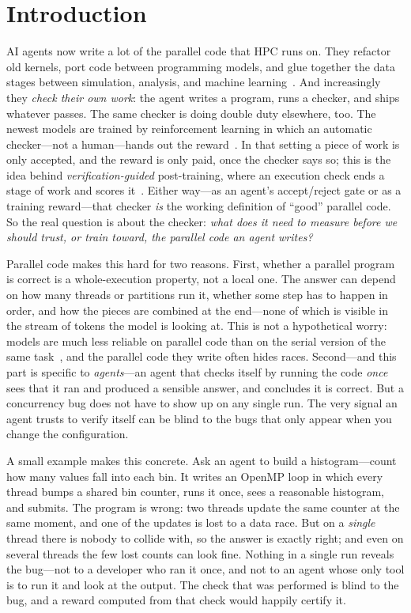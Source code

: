 \section{Introduction}

AI agents now write a lot of the parallel code that HPC runs on. They refactor old
kernels, port code between programming models, and glue together the data stages between
simulation, analysis, and machine learning~\cite{agentic_hpc}. And increasingly they
\emph{check their own work}: the agent writes a program, runs a checker, and ships
whatever passes. The same checker is doing double duty elsewhere, too. The newest models
are trained by reinforcement learning in which an automatic checker---not a human---hands
out the reward~\cite{rlvr,grpo}. In that setting a piece of work is only accepted, and the
reward is only paid, once the checker says so; this is the idea behind
\emph{verification-guided} post-training, where an execution check ends a stage of work
and scores it~\cite{options}. Either way---as an agent's accept/reject gate or as a
training reward---that checker \emph{is} the working definition of ``good'' parallel code.
So the real question is about the checker: \emph{what does it need to measure before we
should trust, or train toward, the parallel code an agent writes?}

Parallel code makes this hard for two reasons. First, whether a parallel program is
correct is a whole-execution property, not a local one. The answer can depend on how many
threads or partitions run it, whether some step has to happen in order, and how the pieces
are combined at the end---none of which is visible in the stream of tokens the model is
looking at. This is not a hypothetical worry: models are much less reliable on parallel
code than on the serial version of the same task~\cite{pareval}, and the parallel code
they write often hides races. Second---and this part is specific to \emph{agents}---an
agent that checks itself by running the code \emph{once} sees that it ran and produced a
sensible answer, and concludes it is correct. But a concurrency bug does not have to show
up on any single run. The very signal an agent trusts to verify itself can be blind to the
bugs that only appear when you change the configuration.

A small example makes this concrete. Ask an agent to build a histogram---count how many
values fall into each bin. It writes an OpenMP loop in which every thread bumps a shared
bin counter, runs it once, sees a reasonable histogram, and submits. The program is wrong:
two threads update the same counter at the same moment, and one of the updates is lost to
a data race. But on a \emph{single} thread there is nobody to collide with, so the answer
is exactly right; and even on several threads the few lost counts can look fine. Nothing
in a single run reveals the bug---not to a developer who ran it once, and not to an agent
whose only tool is to run it and look at the output. The check that was performed is blind
to the bug, and a reward computed from that check would happily certify it.


